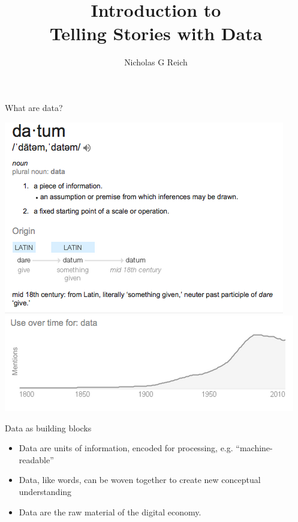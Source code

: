 \documentclass[table]{beamer}\usepackage[]{graphicx}\usepackage[]{color}
\title{Introduction to \\ Telling Stories with Data}
\author{Nicholas G Reich}
\begin{document}
\begin{frame}[plain]
	\titlepage
\end{frame}






\begin{frame}{What are data?}


\vspace{1em}

\includegraphics[width=.48\textwidth]{figure-static/data-definition.png}
\includegraphics[width=.48\textwidth]{figure-static/data-usage-over-time.png}


\begin{block}{Data as building blocks}

\begin{itemize}
	\item Data are units of information, encoded for processing, e.g. ``machine-readable''
	\item Data, like words, can be woven together to create new conceptual understanding
	\item Data are the raw material of the digital economy.
\end{itemize}

\end{block}


\end{frame}
\end{document}
